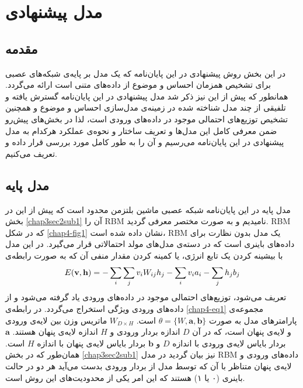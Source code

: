 \chapter{مدل پیشنهادی}
\thispagestyle{empty}
\section{مقدمه}
در این بخش روش پیشنهادی در این پایان‌‌نامه که یک مدل بر پایه‌ی شبکه‌های عصبی برای تشخیص همزمان احساس و موضوع از داده‌های متنی است ارائه می‌‌گردد. همانطور که پیش از این نیز ذکر شد مدل پیشنهادی در این پایان‌‌نامه گسترش یافته و تلفیقی از چند مدل شناخته شده در زمینه‌ی مدل‌سازی احساس و موضوع و همچنین تشخیص توزیع‌های احتمالی‌ موجود در داده‌های ورودی است، لذا در بخش‌های پیش‌ر‌‌و ضمن معرفی‌ کامل این مدل‌ها و تعریف ساختار و 
نحو‌ه‌ی عملکرد هرکدام به مدل پیشنهادی در این پایان‌‌نامه می‌‌رسیم و آن را به طور کامل مورد بررسی‌ قرار داده و تعریف می‌‌کنیم.

\section{مدل پایه}
\label{chap4sec2}
مدل پایه در این پایان‌‌نامه  شبکه عصبی ماشین بلتزمن محدود است که پیش از این در بخش
\ref{chap3sec2sub1}
 آن را
RBM
نامیدیم و به صورت مختصر معرفی‌ گردید.
RBM
که در شکل
\ref{chap4-fig1}
نشان داده شده است،
 RBM 
 یک مدل بدون نظارت برای داده‌های باینری است که در دسته‌ی مدل‌های مولد احتمالاتی  قرار می‌گیرد. در این مدل با بیشینه کردن یک تابع انرژی، یا کمینه کردن مقدار منفی‌ آن که به صورت رابطه‌ی
\begin{align}
	\centering
	\label{chap4-eq1}
	E(\textbf{v},\textbf{h}) = -\sum_{i} \sum_{j} v_iW_{ij}h_j - \sum_i v_ia_i - \sum_j h_jb_j
\end{align}
تعریف می‌‌شود، توزیع‌های احتمالی‌ موجود در داده‌های ورودی یاد گرفته می‌شود و از داده‌های ورودی ویژگی‌ استخراج می‌‌گردد. در رابطه‌ی
\ref{chap4-eq1}
مجموعه‌ی پارامترهای مدل به صورت
$\theta = \{W, \textbf{a}, \textbf{b}\}$
است.
$W_{D \times H}$
ماتریس وزن بین لایه‌ی ورودی و لایه‌ی پنهان است، که در آن
$D$
اندازه بردار ورودی و
$H$
اندازه لایه‌ی پنهان هستند.
$\textbf{a}$
بردار بایاس لایه‌ی ورودی با اندازه
$D$
و
$\textbf{b}$
بردار بایاس لایه‌ی پنهان با اندازه
$H$
 است. همان‌طور که در بخش 
 \ref{chap3sec2sub1}
نیز بیان گردید در مدل
 RBM
 داده‌های ورودی و لایه‌ی پنهان متناظر با آن که توسط مدل از بردار ورودی بدست می‌‌آید هر دو در حالت باینری (۰ یا ۱) هستند که این امر یکی‌ از محدودیت‌های این روش است.


